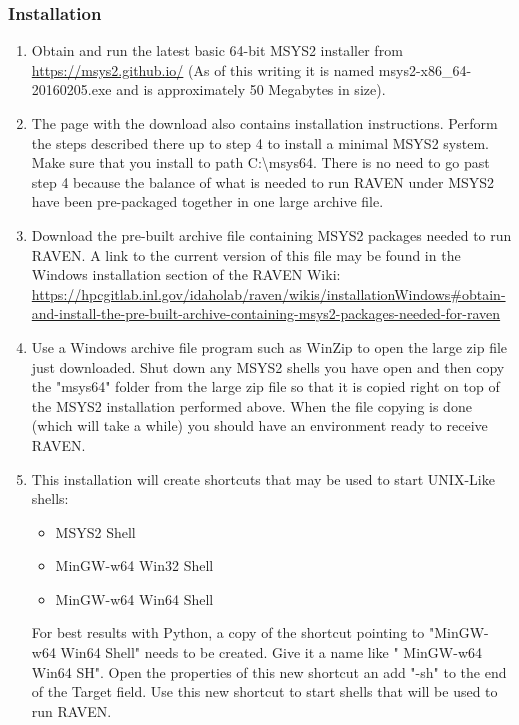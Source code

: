 \subsubsection{Installation}
\begin{enumerate}
    \item Obtain and run the latest basic 64-bit MSYS2 installer from \url{ https://msys2.github.io/} (As of this writing it is named
	msys2-x86\_64-20160205.exe and is approximately 50 Megabytes in size).  
    \item The page with the download also contains installation instructions. Perform the steps described there up to 
	step 4 to install a minimal MSYS2 system. Make sure that you install to path C:\textbackslash{}msys64. There 
	is no need to go past step 4 because the balance of what is needed to run RAVEN under MSYS2 have been 
	pre-packaged together in one large archive file. 
    \item Download the pre-built archive file containing MSYS2 packages needed to run RAVEN.  A link to the current version of
	this file may be found in the Windows installation section of the RAVEN Wiki: 
	\url{https://hpcgitlab.inl.gov/idaholab/raven/wikis/installationWindows#obtain-and-install-the-pre-built-archive-containing-msys2-packages-needed-for-raven}
    \item Use a Windows archive file program such as WinZip to open the large zip file just downloaded.  Shut down any 
	MSYS2 shells you have open and then copy the "msys64" folder from the large zip file so that it is copied right 
	on top of the MSYS2 installation performed above. When the file copying is done (which will take a while) 
	you should have an environment ready to receive RAVEN.
    \item This installation will create shortcuts that may be used to start UNIX-Like shells:
	\begin{itemize}
	    \item MSYS2 Shell
	    \item MinGW-w64 Win32 Shell
	    \item MinGW-w64 Win64 Shell
	\end{itemize}
	For best results with Python, a copy of the shortcut pointing to  "MinGW-w64 Win64 Shell" needs to be created. Give
	it a name like " MinGW-w64 Win64 SH".  Open the properties of this new shortcut an add "-sh" to the end of the Target
	field.  Use this new shortcut to start shells that will be used to run RAVEN.
\end{enumerate}


